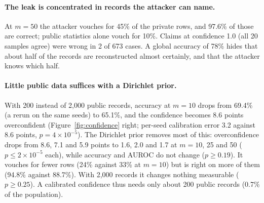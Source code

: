 \paragraph{The leak is concentrated in records the attacker can name.} At $m=50$ the attacker vouches for 45\% of the private rows, and 97.6\% of those are correct; public statistics alone vouch for 10\%. Claims at confidence 1.0 (all 20 samples agree) were wrong in 2 of 673 cases. A global accuracy of 78\% hides that about half of the records are reconstructed almost certainly, and that the attacker knows which half.

\paragraph{Little public data suffices with a Dirichlet prior.} With 200 instead of 2,000 public records, accuracy at $m=10$ drops from 69.4\% (a rerun on the same seeds) to 65.1\%, and the confidence becomes 8.6 points overconfident (Figure~\ref{fig:confidence} right; per-seed calibration error 3.2 against 8.6 points, $p=4\times10^{-5}$). The Dirichlet prior removes most of this: overconfidence drops from 8.6, 7.1 and 5.9 points to 1.6, 2.0 and 1.7 at $m=10$, 25 and 50 ($p\leq2\times10^{-5}$ each), while accuracy and AUROC do not change ($p\geq0.19$). It vouches for fewer rows (24\% against 33\% at $m=10$) but is right on more of them (94.8\% against 88.7\%). With 2,000 records it changes nothing measurable ($p\geq0.25$). A calibrated confidence thus needs only about 200 public records (0.7\% of the population).
